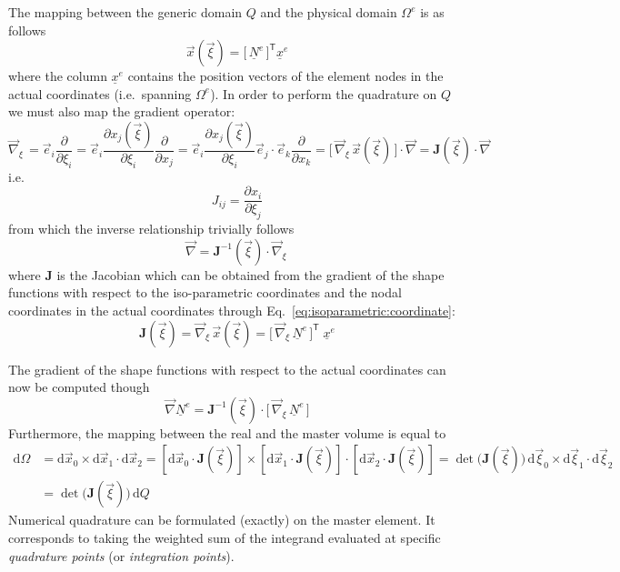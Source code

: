 \documentclass[times,namecite]{goose-article}
\begin{document}
The mapping between the generic domain $Q$ and the physical domain $\Omega^e$ is as follows
\begin{equation}
\label{eq:isoparametric:coordinate}
  \vec{x} ( \vec{\xi} ) = \big[\, \underline{N}^{e} \,\big]^\mathsf{T} \underline{x}^e
\end{equation}
where the column $\underline{x}^e$ contains the position vectors of the element nodes in the actual coordinates (i.e.\ spanning $\Omega^e$). In order to perform the quadrature on $Q$ we must also map the gradient operator:
\begin{equation}
  \vec{\nabla}_{\xi}\,
  =
  \vec{e}_i \frac{\partial}{\partial \xi_i}
  =
  \vec{e}_i \frac{\partial x_j(\vec{\xi})}{\partial \xi_i} \frac{\partial}{\partial x_j}
  =
  \vec{e}_i \frac{\partial x_j(\vec{\xi})}{\partial \xi_i} \vec{e}_j \cdot \vec{e}_k \frac{\partial}{\partial x_k}
  =
  \big[\, \vec{\nabla}_{\xi}\, \vec{x}(\vec{\xi}) \,\big] \cdot \vec{\nabla}
  =
  \bm{J}(\vec{\xi}) \cdot \vec{\nabla}
\end{equation}
i.e.
\begin{equation}
  J_{ij} = \frac{\partial x_i}{\partial \xi_j}
\end{equation}
from which the inverse relationship trivially follows
\begin{equation}
  \vec{\nabla} = \bm{J}^{-1}(\vec{\xi}) \cdot \vec{\nabla}_{\xi}\,
\end{equation}
where $\bm{J}$ is the Jacobian which can be obtained from the gradient of the shape functions with respect to the iso-parametric coordinates and the nodal coordinates in the actual coordinates through Eq.~\eqref{eq:isoparametric:coordinate}:
\begin{equation}
  \bm{J}(\vec{\xi})
  =
  \vec{\nabla}_{\xi}\, \vec{x}(\vec{\xi})
  =
  \big[\, \vec{\nabla}_{\xi}\, \underline{N}^{e} \,\big]^\mathsf{T} \; \underline{x}^e
\end{equation}

The gradient of the shape functions with respect to the actual coordinates can now be computed though
\begin{equation}
  \vec{\nabla} \underline{N}^{e}
  =
  \bm{J}^{-1}(\vec{\xi}) \cdot  \big[\, \vec{\nabla}_{\xi}\, \underline{N}^{e} \,\big]
\end{equation}
Furthermore, the mapping between the real and the master volume is equal to
\begin{align}
  \mathrm{d} \Omega
  &=
  \mathrm{d} \vec{x}_0 \times \mathrm{d} \vec{x}_1 \cdot \mathrm{d} \vec{x}_2
  =
  \left[ \mathrm{d} \vec{x}_0 \cdot \bm{J}(\vec{\xi}) \right] \times
  \left[ \mathrm{d} \vec{x}_1 \cdot \bm{J}(\vec{\xi}) \right] \cdot
  \left[ \mathrm{d} \vec{x}_2 \cdot \bm{J}(\vec{\xi}) \right]
  =
  \det \big( \bm{J}(\vec{\xi}) \big)\,
  \mathrm{d} \vec{\xi}_0 \times \mathrm{d} \vec{\xi}_1 \cdot \mathrm{d} \vec{\xi}_2
  \\
  &=
  \det \big( \bm{J}(\vec{\xi}) \big)\, \mathrm{d} Q
\end{align}
Numerical quadrature can be formulated (exactly) on the master element. It corresponds to taking the weighted sum of the integrand evaluated at specific \emph{quadrature points} (or \emph{integration points}).
\end{document}
